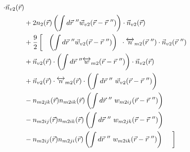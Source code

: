 \documentclass[double,12pt]{beavtex}
\begin{document}
\begin{align}
     \cdot \vec n_{v2}(\vec r) \nonumber\\
      &+ 2n_2(\vec r)\left(\int d\vec r~'' \vec 
     w_{v2}(\vec r-\vec r~'')\right)\cdot \vec n_{v2}(\vec r)\nonumber \\
     &+\frac{9}{2}\left[\color{white}\frac{1}{1}\color{black}\left(\int 
     d\vec r~'' \vec w_{v2}(\vec r-\vec r~'')\right)\color{white}\right]
     \color{black}
     \cdot \overleftrightarrow n_{m2}(\vec r~'')\cdot \vec n_{v2}(\vec r~'') 
     \nonumber\\
     &+\vec n_{v2}(\vec r)\cdot \left(\int d\vec r~'' \overleftrightarrow 
     w_{m2}(\vec r-\vec r~'')\right)
     \cdot \vec n_{v2}( \vec r) \nonumber\\
%     
     &+ \color{white}\color{black}\vec n_{v2}( \vec r)\cdot 
     \overleftrightarrow n_{m2}(\vec r)
     \cdot \left(\int d\vec r~'' ~\vec w_{v2}(\vec r-\vec r~'')\right)
     \nonumber\\
     &-n_{m2jk}(\vec r)n_{m2ik}(\vec r)\left(\int d\vec r~''~w_{m2ij}
     (\vec r-\vec r~'')\right) \nonumber \\
     &-n_{m2ij}(\vec r)n_{m2ik}(\vec r)\left(\int d\vec r~''~w_{m2jk}
     (\vec r-\vec r~'')\right)\nonumber \\
     &-n_{m2ij}(\vec r)n_{m2ji}(\vec r)\left(\int d\vec r~''~w_{m2ik}
     (\vec r-\vec r~'')\right)     
     \color{white}\left[\frac{1}{1}\color{black}\right] 
\end{align} 
\end{document}
